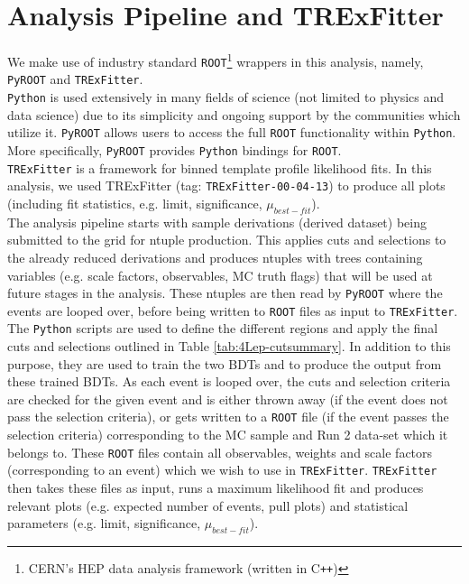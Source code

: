 \section{Analysis Pipeline and TRExFitter}
\label{sec:pipelineAnalysis-and-TRF}
We make use of industry standard \texttt{ROOT}\footnote{CERN's HEP data analysis framework (written in C\texttt{++})} wrappers in this analysis, namely, \texttt{PyROOT} and \texttt{TRExFitter}.\\

\texttt{Python} is used extensively in many fields of science (not limited to physics and data science) due to its simplicity and ongoing support by the communities which utilize it. \texttt{PyROOT} allows users to access the full \texttt{ROOT} functionality within \texttt{Python}. More specifically, \texttt{PyROOT} provides \texttt{Python} bindings for \texttt{ROOT}.\\

\texttt{TRExFitter} is a framework for binned template profile likelihood fits\cite{TRexfitter}. In this analysis, we used TRExFitter (tag: \texttt{TRExFitter-00-04-13}) to produce all plots (including fit statistics, e.g. limit, significance, $\mu_{best-fit}$).\\

The analysis pipeline starts with sample derivations (derived dataset) being submitted to the grid for ntuple production. This applies cuts and selections to the already reduced derivations and produces ntuples with trees containing variables (e.g. scale factors, observables, MC truth flags) that will be used at future stages in the analysis. These ntuples are then read by \texttt{PyROOT} where the events are looped over, before being written to \texttt{ROOT} files as input to \texttt{TRExFitter}. The \texttt{Python} scripts are used to define the different regions and apply the final cuts and selections outlined in Table \ref{tab:4Lep-cutsummary}. In addition to this purpose, they are used to train the two BDTs and to produce the output from these trained BDTs. As each event is looped over, the cuts and selection criteria are checked for the given event and is either thrown away (if the event does not pass the selection criteria), or gets written to a \texttt{ROOT} file (if the event passes the selection criteria) corresponding to the MC sample and Run 2 data-set which it belongs to. These \texttt{ROOT} files contain all observables, weights and scale factors (corresponding to an event) which we wish to use in \texttt{TRExFitter}. \texttt{TRExFitter} then takes these files as input, runs a maximum likelihood fit and produces relevant plots (e.g. expected number of events, pull plots) and statistical parameters (e.g. limit, significance, $\mu_{best-fit}$).



